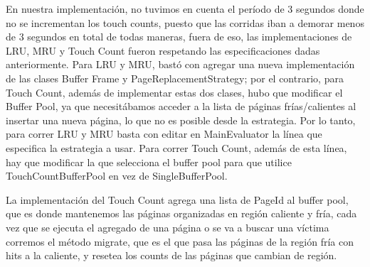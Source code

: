 En nuestra implementaci\'on, no tuvimos en cuenta el per\'iodo de 3 segundos donde no se incrementan los touch counts, puesto que las corridas iban a demorar menos de 3 segundos en total de todas maneras, fuera de eso, las implementaciones de LRU, MRU y Touch Count fueron respetando las especificaciones dadas anteriormente. Para LRU y MRU, bast\'o con agregar una nueva implementaci\'on de las clases Buffer Frame y PageReplacementStrategy; por el contrario, para Touch Count, adem\'as de implementar estas dos clases, hubo que modificar el Buffer Pool, ya que necesit\'abamos acceder a la lista de p\'aginas fr\'ias/calientes al insertar una nueva p\'agina, lo que no es posible desde la estrategia. Por lo tanto, para correr LRU y MRU basta con editar en MainEvaluator la l\'inea que especifica la estrategia a usar. Para correr Touch Count, adem\'as de esta l\'inea, hay que modificar la que selecciona el buffer pool para que utilice TouchCountBufferPool en vez de SingleBufferPool.

La implementaci\'on del Touch Count agrega una lista de PageId al buffer pool, que es donde mantenemos las p\'aginas organizadas en regi\'on caliente y fr\'ia, cada vez que se ejecuta el agregado de una p\'agina o se va a buscar una v\'ictima corremos el m\'etodo migrate, que es el que pasa las p\'aginas de la regi\'on fr\'ia con hits a la caliente, y resetea los counts de las p\'aginas que cambian de regi\'on.

